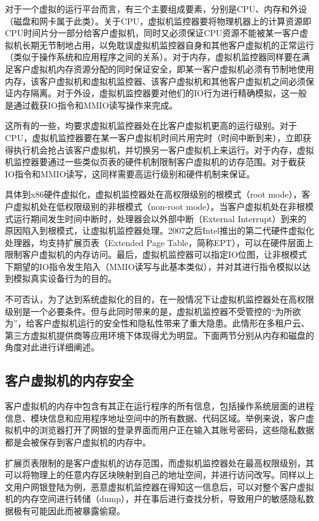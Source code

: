 对于一个虚拟的运行平台而言，有三个主要组成要素，分别是CPU、内存和外设（磁盘和网卡属于此类）。关于CPU，虚拟机监控器要将物理机器上的计算资源即CPU时间片分一部分给客户虚拟机，同时又必须保证CPU资源不能被某一客户虚拟机长期无节制地占用，以免耽误虚拟机监控器自身和其他客户虚拟机的正常运行（类似于操作系统和应用程序之间的关系）。对于内存，虚拟机监控器同样要在满足客户虚拟机内存资源分配的同时保证安全，即某一客户虚拟机必须有节制地使用内存，该客户虚拟机和虚拟机监控器、该客户虚拟机和其他客户虚拟机之间必须保证内存隔离。对于外设，虚拟机监控器要对他们的IO行为进行精确模拟，这一般是通过截获IO指令和MMIO读写操作来完成。

这所有的一些，均要求虚拟机监控器处在比客户虚拟机更高的运行级别。对于CPU，虚拟机监控器要在某一客户虚拟机时间片用完时（时间中断到来），立即获得执行机会抢占该客户虚拟机，并切换另一客户虚拟机上来运行。对于内存，虚拟机监控器要通过一些类似页表的硬件机制限制客户虚拟机的访存范围。对于截获IO指令和MMIO读写，这同样需要高运行级别和硬件机制来保证。

具体到x86硬件虚拟化，虚拟机监控器处在高权限级别的根模式（root mode），客户虚拟机处在低权限级别的非根模式（non-root mode）。当客户虚拟机处在非根模式运行期间发生时间中断时，处理器会以外部中断（External Interrupt）到来的原因陷入到根模式，让虚拟机监控器处理。2007之后Intel推出的第二代硬件虚拟化处理器，均支持扩展页表（Extended Page Table，简称EPT），可以在硬件层面上限制客户虚拟机的内存访问。最后，虚拟机监控器可以指定IO位图，让非根模式下期望的IO指令发生陷入（MMIO读写与此基本类似），并对其进行指令模拟以达到模拟真实设备行为的目的。

不可否认，为了达到系统虚拟化的目的，在一般情况下让虚拟机监控器处在高权限级别是一个必要条件。但与此同时带来的是，虚拟机监控器不受管控的“为所欲为”，给客户虚拟机运行的安全性和隐私性带来了重大隐患。此情形在多租户云、第三方虚拟机提供商等应用环境下体现得尤为明显。下面两节分别从内存和磁盘的角度对此进行详细阐述。

\subsection{客户虚拟机的内存安全}

客户虚拟机的内存中包含有其正在运行程序的所有信息，包括操作系统层面的进程信息、模块信息和应用程序地址空间中的所有数据、代码区域。举例来说，客户虚拟机中的浏览器打开了网银的登录界面而用户正在输入其账号密码，这些隐私数据都是会被保存到客户虚拟机的内存中。

扩展页表限制的是客户虚拟机的访存范围，而虚拟机监控器处在最高权限级别，其可以将物理上的任意内存区块映射到自己的地址空间，并进行访问改写。同样以上文用户网银登陆为例，恶意虚拟机监控器在得知这一信息后，可以对整个客户虚拟机的内存空间进行转储（dump），并在事后进行查找分析，导致用户的敏感隐私数据极有可能因此而被暴露偷窥。

